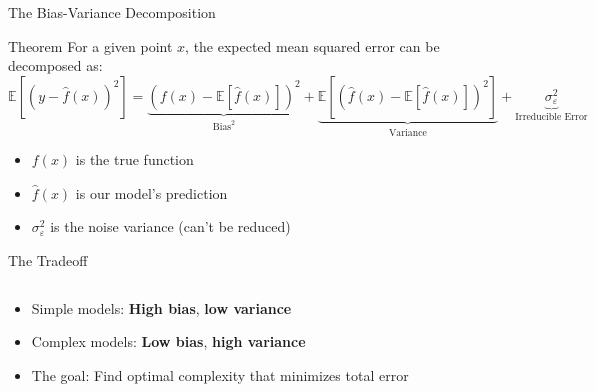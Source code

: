 \documentclass{beamer}
\begin{document}
\begin{frame}{The Bias-Variance Decomposition}
  \begin{block}{Theorem}
    For a given point $x$, the expected mean squared error can be decomposed as:
    \[
    \mathbb{E}[(y - \hat{f}(x))^2] = \underbrace{(f(x) - \mathbb{E}[\hat{f}(x)])^2}_{\text{Bias}^2} + \underbrace{\mathbb{E}[(\hat{f}(x) - \mathbb{E}[\hat{f}(x)])^2]}_{\text{Variance}} + \underbrace{\sigma^2_\varepsilon}_{\text{Irreducible Error}}
    \]
  \end{block}

  \begin{itemize}
    \item $f(x)$ is the true function
    \item $\hat{f}(x)$ is our model's prediction
    \item $\sigma^2_\varepsilon$ is the noise variance (can't be reduced)
  \end{itemize}
\end{frame}

\begin{frame}{The Tradeoff}
  \begin{columns}
    \begin{column}{0.6\textwidth}
      \begin{itemize}
        \item Simple models: \textbf{High bias}, \textbf{low variance}
        \item Complex models: \textbf{Low bias}, \textbf{high variance}
        \item The goal: Find optimal complexity that minimizes total error
      \end{itemize}
    \end{column}
    \begin{column}{0.4\textwidth}
      \center
    \end{column}
  \end{columns}
\end{frame}
\end{document}
